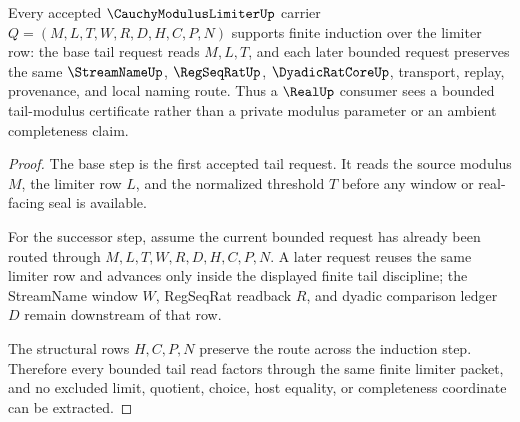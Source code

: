 \begin{theorem}
\label{thm:cauchy-modulus-limiter-tail-bound-induction}
Every accepted $\CauchyModulusLimiterUp$ carrier $Q=(M,L,T,W,R,D,H,C,P,N)$ supports finite induction over the limiter row: the base tail request reads $M,L,T$, and each later bounded request preserves the same $\StreamNameUp$, $\RegSeqRatUp$, $\DyadicRatCoreUp$, transport, replay, provenance, and local naming route. Thus a $\RealUp$ consumer sees a bounded tail-modulus certificate rather than a private modulus parameter or an ambient completeness claim.
\end{theorem}
\begin{proof}
The base step is the first accepted tail request. It reads the source modulus $M$, the limiter row $L$, and the normalized threshold $T$ before any window or real-facing seal is available.

For the successor step, assume the current bounded request has already been routed through $M,L,T,W,R,D,H,C,P,N$. A later request reuses the same limiter row and advances only inside the displayed finite tail discipline; the StreamName window $W$, RegSeqRat readback $R$, and dyadic comparison ledger $D$ remain downstream of that row.

The structural rows $H,C,P,N$ preserve the route across the induction step. Therefore every bounded tail read factors through the same finite limiter packet, and no excluded limit, quotient, choice, host equality, or completeness coordinate can be extracted.
\end{proof}




